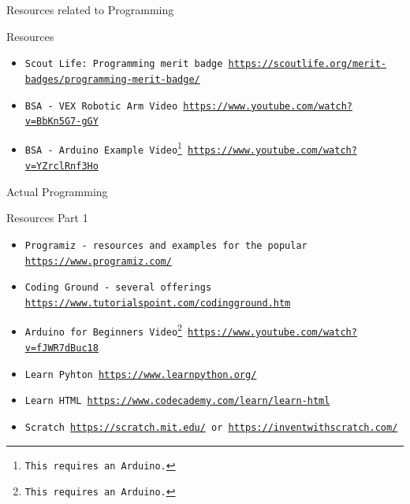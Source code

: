 \documentclass[10pt]{beamer}
\begin{document}
{%

\begin{frame}{Resources related to Programming}{}
\begin{block}{Resources}
  \begin{itemize}
    \item {\tt Scout Life: Programming merit badge \url{https://scoutlife.org/merit-badges/programming-merit-badge/}}
    \item {\tt BSA - VEX Robotic Arm Video \url{https://www.youtube.com/watch?v=BbKn5G7-gGY}}
    \item {\tt BSA - Arduino Example Video\footnote{\label{ard_rqd}This requires an Arduino.} \url{https://www.youtube.com/watch?v=YZrclRnf3Ho}}
    
    \end{itemize}
  \end{block}
\end{frame}


\begin{frame}{Actual Programming}{}
\begin{block}{Resources Part 1}
  \begin{itemize}
    \item {\tt Programiz - resources and examples for the popular \url{https://www.programiz.com/}}
    \item {\tt Coding Ground - several offerings \url{https://www.tutorialspoint.com/codingground.htm}}
    \item {\tt Arduino for Beginners Video\footnote{\label{ard_rqd}This requires an Arduino.} \url{https://www.youtube.com/watch?v=fJWR7dBuc18}}
    \item {\tt Learn Pyhton \url{https://www.learnpython.org/}}
    \item {\tt Learn HTML \url{https://www.codecademy.com/learn/learn-html}}
    \item {\tt Scratch \url{https://scratch.mit.edu/} or \url{https://inventwithscratch.com/}}
    \end{itemize}
  \end{block}
\end{frame}


}
\end{document}
